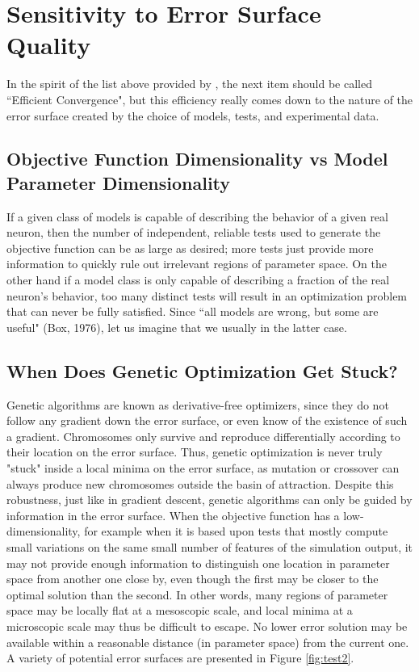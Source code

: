 \section{Sensitivity to Error Surface Quality}
In the spirit of the list above provided by \cite{van2007neurofitter}, the next item should be called ``Efficient Convergence", but this efficiency really comes down to the nature of the error surface created by the choice of models, tests, and experimental data.

\subsection{Objective Function Dimensionality vs Model Parameter Dimensionality}
If a given class of models is capable of describing the behavior of a given real neuron, then the number of independent, reliable tests used to generate the objective function can be as large as desired; more tests just provide more information to quickly rule out irrelevant regions of parameter space.
On the other hand if a model class is only capable of describing a fraction of the real neuron's behavior, too many distinct tests will result in an optimization problem that can never be fully satisfied.
Since ``all models are wrong, but some are useful" (Box, 1976), let us imagine that we usually in the latter case.

\subsection{When Does Genetic Optimization Get Stuck?}
Genetic algorithms are known as derivative-free optimizers, since they do not follow any gradient down the error surface, or even know of the existence of such a gradient.
Chromosomes only survive and reproduce differentially according to their location on the error surface.
Thus, genetic optimization is never truly "stuck" inside a local minima on the error surface, as mutation or crossover can always produce new chromosomes outside the basin of attraction.
Despite this robustness, just like in gradient descent, genetic algorithms can only be guided by information in the error surface.
When the objective function has a low-dimensionality, for example when it is based upon tests that mostly compute small variations on the same small number of features of the simulation output, it may not provide enough information to distinguish one location in parameter space from another one close by, even though the first may be closer to the optimal solution than the second.
In other words, many regions of parameter space may be locally flat at a mesoscopic scale, and local minima at a microscopic scale may thus be difficult to escape.
No lower error solution may be available within a reasonable distance (in parameter space) from the current one.
A variety of potential error surfaces are presented in Figure \ref{fig:test2}.

